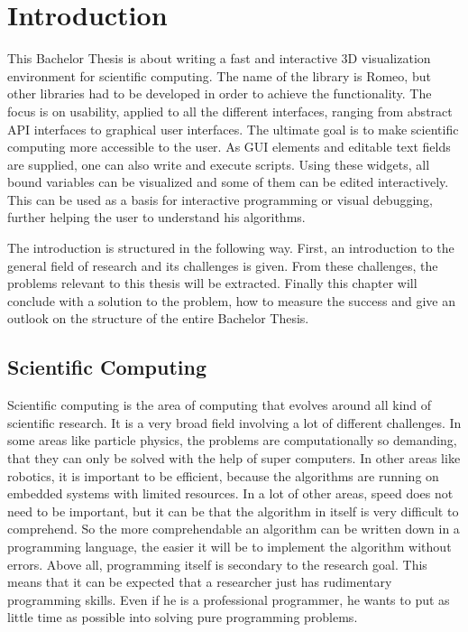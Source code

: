 \section{Introduction}
This Bachelor Thesis is about writing a fast and interactive 3D visualization environment for scientific computing.
The name of the library is Romeo, but other libraries had to be developed in order to achieve the functionality. 
The focus is on usability, applied to all the different interfaces, ranging from abstract API interfaces to graphical user interfaces. 
The ultimate goal is to make scientific computing more accessible to the user.
As \ac{GUI} elements and editable text fields are supplied, one can also write and execute scripts.
Using these widgets, all bound variables can be visualized and some of them can be edited interactively. 
This can be used as a basis for interactive programming or visual debugging, further helping the user to understand his algorithms.

The introduction is structured in the following way.
First, an introduction to the general field of research and its challenges is given. 
From these challenges, the problems relevant to this thesis will be extracted.
Finally this chapter will conclude with a solution to the problem, how to measure the success and give an outlook on the structure of the entire Bachelor Thesis.


\subsection{Scientific Computing}
Scientific computing is the area of computing that evolves around all kind of scientific research.
It is a very broad field involving a lot of different challenges. 
In some areas like particle physics, the problems are computationally so demanding, that they can only be solved with the help of super computers.
In other areas like robotics, it is important to be efficient, because the algorithms are running on embedded systems with limited resources. 
In a lot of other areas, speed does not need to be important, but it can be that the algorithm in itself is very difficult to comprehend. 
So the more comprehendable an algorithm can be written down in a programming language, the easier it will be to implement the algorithm without errors.
Above all, programming itself is secondary to the research goal.
This means that it can be expected that a researcher just has rudimentary programming skills. Even if he is a professional programmer, he wants to put as little time as possible into solving pure programming problems.

